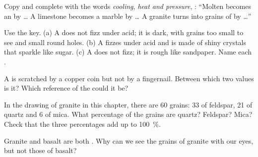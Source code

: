 \begin{exercise}[$\star$]\label{exo:g6:rocks-and-minerals:4}
Copy and complete with the words \emph{cooling}, \emph{heat and pressure},
\emph{}: ``Molten  becomes an  by \ldots{} A
limestone becomes a marble by \ldots{} A granite turns into grains of 
by \ldots''
\end{exercise}

\begin{exercise}[$\star\star$]\label{exo:g6:rocks-and-minerals:5}
Use the key. (a) A  does not fizz under acid; it is dark, with grains
too small to see and small round holes. (b) A  fizzes under acid and
is made of shiny crystals that sparkle like sugar. (c) A  does not
fizz; it is rough like sandpaper. Name each .
\end{exercise}

\begin{exercise}[$\star\star$]\label{exo:g6:rocks-and-minerals:6}
A  is scratched by a copper coin but not by a fingernail. Between
which two  values is it? Which reference  of the 
could it be?
\end{exercise}

\begin{exercise}[$\star\star$]\label{exo:g6:rocks-and-minerals:7}
In the drawing of granite in this chapter, there are 60 grains: 33 of
feldspar, 21 of quartz and 6 of mica. What percentage of the grains are
quartz? Feldspar? Mica? Check that the three percentages add up to
100~\%.
\end{exercise}

\begin{exercise}[$\star\star$]\label{exo:g6:rocks-and-minerals:8}
Granite and basalt are both . Why can we see the grains of
granite with our eyes, but not those of basalt?
\end{exercise}

